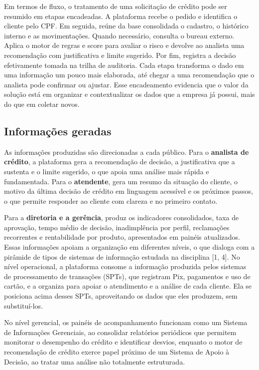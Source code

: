 \documentclass[12pt,a4paper]{article}
\begin{document}
Em termos de fluxo, o tratamento de uma solicita\c{c}\~ao de cr\'edito pode ser resumido em etapas encadeadas. A plataforma recebe o pedido e identifica o cliente pelo CPF. Em seguida, re\'une da base consolidada o cadastro, o hist\'orico interno e as movimenta\c{c}\~oes. Quando necess\'ario, consulta o bureau externo. Aplica o motor de regras e score para avaliar o risco e devolve ao analista uma recomenda\c{c}\~ao com justificativa e limite sugerido. Por fim, registra a decis\~ao efetivamente tomada na trilha de auditoria. Cada etapa transforma o dado em uma informa\c{c}\~ao um pouco mais elaborada, at\'e chegar a uma recomenda\c{c}\~ao que o analista pode confirmar ou ajustar. Esse encadeamento evidencia que o valor da solu\c{c}\~ao est\'a em organizar e contextualizar os dados que a empresa j\'a possui, mais do que em coletar novos.

\subsection{Informa\c{c}\~oes geradas}

As informa\c{c}\~oes produzidas s\~ao direcionadas a cada p\'ublico. Para o \textbf{analista de cr\'edito}, a plataforma gera a recomenda\c{c}\~ao de decis\~ao, a justificativa que a sustenta e o limite sugerido, o que apoia uma an\'alise mais r\'apida e fundamentada. Para o \textbf{atendente}, gera um resumo da situa\c{c}\~ao do cliente, o motivo da \'ultima decis\~ao de cr\'edito em linguagem acess\'ivel e os pr\'oximos passos, o que permite responder ao cliente com clareza e no primeiro contato.

Para a \textbf{diretoria e a ger\^encia}, produz os indicadores consolidados, taxa de aprova\c{c}\~ao, tempo m\'edio de decis\~ao, inadimpl\^encia por perfil, reclama\c{c}\~oes recorrentes e rentabilidade por produto, apresentados em pain\'eis atualizados. Essas informa\c{c}\~oes apoiam a organiza\c{c}\~ao em diferentes n\'iveis, o que dialoga com a pir\^amide de tipos de sistemas de informa\c{c}\~ao estudada na disciplina [1, 4]. No n\'ivel operacional, a plataforma consome a informa\c{c}\~ao produzida pelos sistemas de processamento de transa\c{c}\~oes (SPTs), que registram Pix, pagamentos e uso de cart\~ao, e a organiza para apoiar o atendimento e a an\'alise de cada cliente. Ela se posiciona acima desses SPTs, aproveitando os dados que eles produzem, sem substitu\'i-los.

No n\'ivel gerencial, os pain\'eis de acompanhamento funcionam como um Sistema de Informa\c{c}\~oes Gerenciais, ao consolidar relat\'orios peri\'odicos que permitem monitorar o desempenho do cr\'edito e identificar desvios, enquanto o motor de recomenda\c{c}\~ao de cr\'edito exerce papel pr\'oximo de um Sistema de Apoio \`a Decis\~ao, ao tratar uma an\'alise n\~ao totalmente estruturada.
\end{document}
